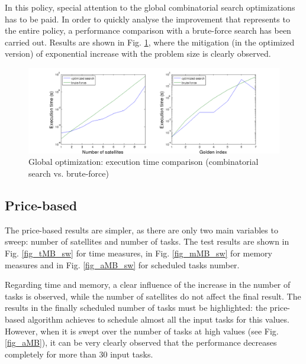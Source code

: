 In this policy, special attention to the global combinatorial search optimizations has to be paid. In order to quickly analyse the improvement that represents to the entire policy, a performance comparison with a brute-force search has been carried out. Results are shown in Fig. \ref{fig_global_brute}, where the mitigation (in the optimized version) of exponential increase with the problem size is clearly observed.

\begin{figure}[h!]
  \includegraphics[width=\linewidth]{Figures/global.png}
  \caption{Global optimization: execution time comparison (combinatorial search vs. brute-force)}\label{fig_global_brute}
\end{figure}


\subsection{Price-based}

The price-based results are simpler, as there are only two main variables to sweep: number of satellites and number of tasks. The test results are shown in Fig. \ref{fig_tMB_sw} for time measures, in Fig. \ref{fig_mMB_sw} for memory measures and in Fig. \ref{fig_aMB_sw} for scheduled tasks number.

Regarding time and memory, a clear influence of the increase in the number of tasks is observed, while the number of satellites do not affect the final result. The results in the finally scheduled number of tasks must be highlighted: the price-based algorithm achieves to schedule almost all the input tasks for this values. However, when it is swept over the number of tasks at high values (see Fig. \ref{fig_aMB}), it can be very clearly observed that the performance decreases completely for more than 30 input tasks.

